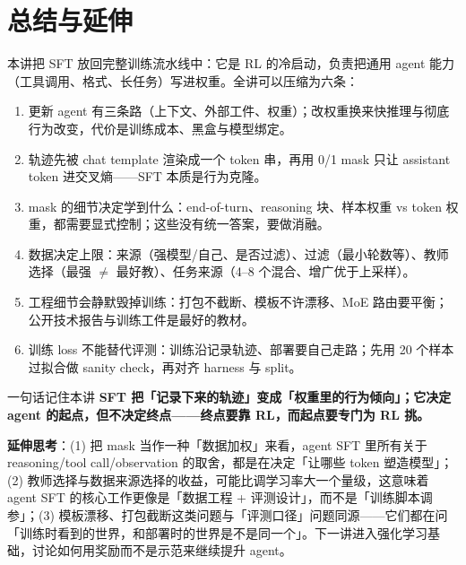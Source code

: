 \documentclass[a4paper]{article}
\begin{document}
\section{总结与延伸}

本讲把 SFT 放回完整训练流水线中：它是 RL 的冷启动，负责把通用 agent 能力（工具调用、格式、长任务）写进权重。全讲可以压缩为六条：

\begin{enumerate}
\item 更新 agent 有三条路（上下文、外部工件、权重）；改权重换来快推理与彻底行为改变，代价是训练成本、黑盒与模型绑定。
\item 轨迹先被 chat template 渲染成一个 token 串，再用 0/1 mask 只让 assistant token 进交叉熵——SFT 本质是行为克隆。
\item mask 的细节决定学到什么：end-of-turn、reasoning 块、样本权重 vs token 权重，都需要显式控制；这些没有统一答案，要做消融。
\item 数据决定上限：来源（强模型/自己、是否过滤）、过滤（最小轮数等）、教师选择（最强 $\neq$ 最好教）、任务来源（4--8 个混合、增广优于上采样）。
\item 工程细节会静默毁掉训练：打包不截断、模板不许漂移、MoE 路由要平衡；公开技术报告与训练工件是最好的教材。
\item 训练 loss 不能替代评测：训练沿记录轨迹、部署要自己走路；先用 20 个样本过拟合做 sanity check，再对齐 harness 与 split。
\end{enumerate}

\begin{importantbox}{一句话记住本讲}
\textbf{SFT 把「记录下来的轨迹」变成「权重里的行为倾向」；它决定 agent 的起点，但不决定终点——终点要靠 RL，而起点要专门为 RL 挑。}
\end{importantbox}

\textbf{延伸思考}：(1) 把 mask 当作一种「数据加权」来看，agent SFT 里所有关于 reasoning/tool call/observation 的取舍，都是在决定「让哪些 token 塑造模型」；(2) 教师选择与数据来源选择的收益，可能比调学习率大一个量级，这意味着 agent SFT 的核心工作更像是「数据工程 + 评测设计」，而不是「训练脚本调参」；(3) 模板漂移、打包截断这类问题与「评测口径」问题同源——它们都在问「训练时看到的世界，和部署时的世界是不是同一个」。下一讲进入强化学习基础，讨论如何用奖励而不是示范来继续提升 agent。
\end{document}
